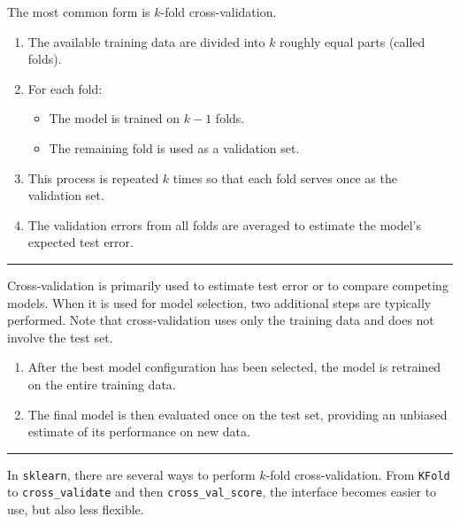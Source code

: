 \documentclass[
  letterpaper,
  DIV=11,
  numbers=noendperiod]{scrreprt}
\providecommand{\tightlist}{%
  \setlength{\itemsep}{0pt}\setlength{\parskip}{0pt}}
\theoremstyle{definition}
\theoremstyle{definition}
\theoremstyle{plain}
\theoremstyle{plain}
\theoremstyle{remark}
\begin{document}
The most common form is \(k\)-fold cross-validation.

\begin{enumerate}
\def\labelenumi{\arabic{enumi}.}
\tightlist
\item
  The available training data are divided into \(k\) roughly equal parts
  (called folds).
\item
  For each fold:

  \begin{itemize}
  \tightlist
  \item
    The model is trained on \(k-1\) folds.
  \item
    The remaining fold is used as a validation set.
  \end{itemize}
\item
  This process is repeated \(k\) times so that each fold serves once as
  the validation set.
\item
  The validation errors from all folds are averaged to estimate the
  model's expected test error.
\end{enumerate}

\begin{center}\rule{0.5\linewidth}{0.5pt}\end{center}

Cross-validation is primarily used to estimate test error or to compare
competing models. When it is used for model selection, two additional
steps are typically performed. Note that cross-validation uses only the
training data and does not involve the test set.

\begin{enumerate}
\def\labelenumi{\arabic{enumi}.}
\setcounter{enumi}{4}
\tightlist
\item
  After the best model configuration has been selected, the model is
  retrained on the entire training data.
\item
  The final model is then evaluated once on the test set, providing an
  unbiased estimate of its performance on new data.
\end{enumerate}

\begin{center}\rule{0.5\linewidth}{0.5pt}\end{center}

In \texttt{sklearn}, there are several ways to perform \(k\)-fold
cross-validation. From \texttt{KFold} to \texttt{cross\_validate} and
then \texttt{cross\_val\_score}, the interface becomes easier to use,
but also less flexible.
\end{document}
